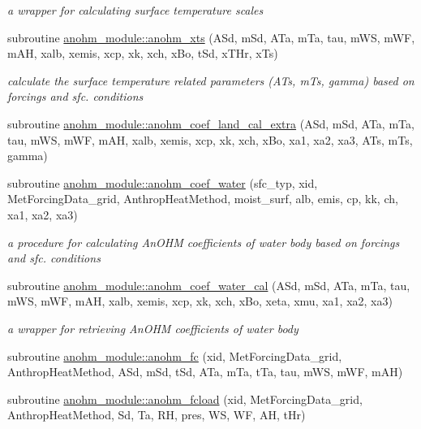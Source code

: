 \begin{DoxyCompactItemize}
\begin{DoxyCompactList}\small\item\em a wrapper for calculating surface temperature scales \end{DoxyCompactList}\item 
subroutine \hyperlink{namespaceanohm__module_a54c27af87baa1736fd40590bed6c081e}{anohm\+\_\+module\+::anohm\+\_\+xts} (A\+Sd, m\+Sd, A\+Ta, m\+Ta, tau, m\+WS, m\+WF, m\+AH, xalb, xemis, xcp, xk, xch, x\+Bo, t\+Sd, x\+T\+Hr, x\+Ts)
\begin{DoxyCompactList}\small\item\em calculate the surface temperature related parameters (A\+Ts, m\+Ts, gamma) based on forcings and sfc. conditions \end{DoxyCompactList}\item 
subroutine \hyperlink{namespaceanohm__module_ab96821e3f733aae01d895aa8830085b7}{anohm\+\_\+module\+::anohm\+\_\+coef\+\_\+land\+\_\+cal\+\_\+extra} (A\+Sd, m\+Sd, A\+Ta, m\+Ta, tau, m\+WS, m\+WF, m\+AH, xalb, xemis, xcp, xk, xch, x\+Bo, xa1, xa2, xa3, A\+Ts, m\+Ts, gamma)
\item 
subroutine \hyperlink{namespaceanohm__module_a5b0b99ebb9db9ec50d904cc7a9802779}{anohm\+\_\+module\+::anohm\+\_\+coef\+\_\+water} (sfc\+\_\+typ, xid, Met\+Forcing\+Data\+\_\+grid, Anthrop\+Heat\+Method, moist\+\_\+surf, alb, emis, cp, kk, ch, xa1, xa2, xa3)
\begin{DoxyCompactList}\small\item\em a procedure for calculating An\+O\+HM coefficients of water body based on forcings and sfc. conditions \end{DoxyCompactList}\item 
subroutine \hyperlink{namespaceanohm__module_aeb16132909e9aae5549d9ce6adcf389f}{anohm\+\_\+module\+::anohm\+\_\+coef\+\_\+water\+\_\+cal} (A\+Sd, m\+Sd, A\+Ta, m\+Ta, tau, m\+WS, m\+WF, m\+AH, xalb, xemis, xcp, xk, xch, x\+Bo, xeta, xmu, xa1, xa2, xa3)
\begin{DoxyCompactList}\small\item\em a wrapper for retrieving An\+O\+HM coefficients of water body \end{DoxyCompactList}\item 
subroutine \hyperlink{namespaceanohm__module_aeb3eededd40f7c2bb12213c747c93513}{anohm\+\_\+module\+::anohm\+\_\+fc} (xid, Met\+Forcing\+Data\+\_\+grid, Anthrop\+Heat\+Method, A\+Sd, m\+Sd, t\+Sd, A\+Ta, m\+Ta, t\+Ta, tau, m\+WS, m\+WF, m\+AH)
\item 
subroutine \hyperlink{namespaceanohm__module_ae189523211fd4b943a0e75cbc1e7b7d1}{anohm\+\_\+module\+::anohm\+\_\+fcload} (xid, Met\+Forcing\+Data\+\_\+grid, Anthrop\+Heat\+Method, Sd, Ta, RH, pres, WS, WF, AH, t\+Hr)

\end{DoxyCompactItemize}
